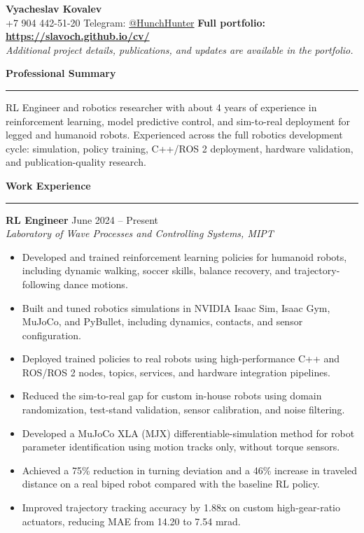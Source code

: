 \documentclass[11pt,a4paper]{article}
\newcommand{\cvsection}[1]{%
  \vspace{10pt}
  {\large\textbf{#1}}\\[-2pt]
  \hrule
  \vspace{6pt}
}
\begin{document}
\begin{center}
  {\LARGE \textbf{Vyacheslav Kovalev}}\\
  \vspace{4pt}
  +7 904 442-51-20 \quad
  Telegram: \href{https://t.me/HunchHunter}{@HunchHunter} \quad
  \textbf{Full portfolio: \href{https://slavoch.github.io/cv/}{https://slavoch.github.io/cv/}}\\
  \textit{Additional project details, publications, and updates are available in the portfolio.}
\end{center}

\cvsection{Professional Summary}
RL Engineer and robotics researcher with about 4 years of experience in reinforcement learning, model predictive control, and sim-to-real deployment for legged and humanoid robots. Experienced across the full robotics development cycle: simulation, policy training, C++/ROS 2 deployment, hardware validation, and publication-quality research.

\cvsection{Work Experience}
\textbf{RL Engineer} \hfill June 2024 -- Present\\
\textit{Laboratory of Wave Processes and Controlling Systems, MIPT}
\begin{itemize}
  \item Developed and trained reinforcement learning policies for humanoid robots, including dynamic walking, soccer skills, balance recovery, and trajectory-following dance motions.
  \item Built and tuned robotics simulations in NVIDIA Isaac Sim, Isaac Gym, MuJoCo, and PyBullet, including dynamics, contacts, and sensor configuration.
  \item Deployed trained policies to real robots using high-performance C++ and ROS/ROS 2 nodes, topics, services, and hardware integration pipelines.
  \item Reduced the sim-to-real gap for custom in-house robots using domain randomization, test-stand validation, sensor calibration, and noise filtering.
  \item Developed a MuJoCo XLA (MJX) differentiable-simulation method for robot parameter identification using motion tracks only, without torque sensors.
  \item Achieved a 75\% reduction in turning deviation and a 46\% increase in traveled distance on a real biped robot compared with the baseline RL policy.
  \item Improved trajectory tracking accuracy by 1.88x on custom high-gear-ratio actuators, reducing MAE from 14.20 to 7.54 mrad.
\end{itemize}
\end{document}

